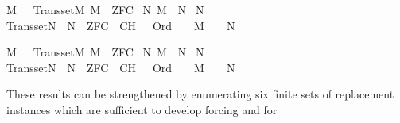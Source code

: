 \begin{isabelle}%
{\isasymlbrakk}M\ {\isasymapprox}\ {\isasymomega}{\isacharsemicolon}{\kern0pt}\ Transset{\isacharparenleft}{\kern0pt}M{\isacharparenright}{\kern0pt}{\isacharsemicolon}{\kern0pt}\ M\ {\isasymTurnstile}\ ZFC{\isasymrbrakk}\isanewline
{\isasymLongrightarrow}\ {\isasymexists}N{\isachardot}{\kern0pt}\ M\ {\isasymsubseteq}\ N\ {\isasymand}\isanewline
{}N\ {\isasymapprox}\ {\isasymomega}\ {\isasymand}\isanewline
{}Transset{\isacharparenleft}{\kern0pt}N{\isacharparenright}{\kern0pt}\ {\isasymand}\ N\ {\isasymTurnstile}\ ZFC\ {\isasymunion}\ {\isacharbraceleft}{\kern0pt}{\isasymcdot}{\isasymnot}{\isasymcdot}CH{\isasymcdot}{\isasymcdot}{\isacharbraceright}{\kern0pt}\ {\isasymand}\ {\isacharparenleft}{\kern0pt}{\isasymforall}{\isasymalpha}{\isachardot}{\kern0pt}\ Ord{\isacharparenleft}{\kern0pt}{\isasymalpha}{\isacharparenright}{\kern0pt}\ {\isasymlongrightarrow}\ {\isasymalpha}\ {\isasymin}\ M\ {\isasymlongleftrightarrow}\ {\isasymalpha}\ {\isasymin}\ N{\isacharparenright}{\kern0pt}%
\end{isabelle}%
\begin{isabelle}%
{\isasymlbrakk}M\ {\isasymapprox}\ {\isasymomega}{\isacharsemicolon}{\kern0pt}\ Transset{\isacharparenleft}{\kern0pt}M{\isacharparenright}{\kern0pt}{\isacharsemicolon}{\kern0pt}\ M\ {\isasymTurnstile}\ ZFC{\isasymrbrakk}\isanewline
{\isasymLongrightarrow}\ {\isasymexists}N{\isachardot}{\kern0pt}\ M\ {\isasymsubseteq}\ N\ {\isasymand}\isanewline
{}N\ {\isasymapprox}\ {\isasymomega}\ {\isasymand}\isanewline
{}Transset{\isacharparenleft}{\kern0pt}N{\isacharparenright}{\kern0pt}\ {\isasymand}\ N\ {\isasymTurnstile}\ ZFC\ {\isasymunion}\ {\isacharbraceleft}{\kern0pt}{\isasymcdot}CH{\isasymcdot}{\isacharbraceright}{\kern0pt}\ {\isasymand}\ {\isacharparenleft}{\kern0pt}{\isasymforall}{\isasymalpha}{\isachardot}{\kern0pt}\ Ord{\isacharparenleft}{\kern0pt}{\isasymalpha}{\isacharparenright}{\kern0pt}\ {\isasymlongrightarrow}\ {\isasymalpha}\ {\isasymin}\ M\ {\isasymlongleftrightarrow}\ {\isasymalpha}\ {\isasymin}\ N{\isacharparenright}{\kern0pt}%
\end{isabelle}%
These results can be strengthened by enumerating six finite sets of
replacement instances which are sufficient to develop forcing and for
